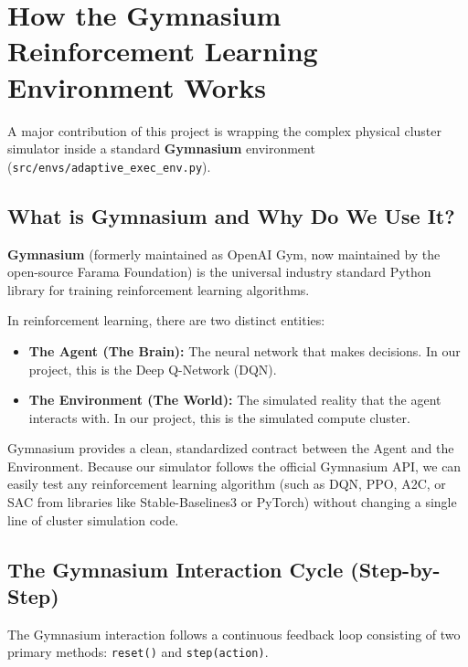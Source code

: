 \documentclass[11pt,a4paper]{article}
\begin{document}
\section{How the Gymnasium Reinforcement Learning Environment Works}
A major contribution of this project is wrapping the complex physical cluster simulator inside a standard \textbf{Gymnasium} environment (\texttt{src/envs/adaptive\_exec\_env.py}). 

\subsection{What is Gymnasium and Why Do We Use It?}
\textbf{Gymnasium} (formerly maintained as OpenAI Gym, now maintained by the open-source Farama Foundation) is the universal industry standard Python library for training reinforcement learning algorithms. 

In reinforcement learning, there are two distinct entities:
\begin{itemize}[noitemsep, topsep=1pt]
    \item \textbf{The Agent (The Brain):} The neural network that makes decisions. In our project, this is the Deep Q-Network (DQN).
    \item \textbf{The Environment (The World):} The simulated reality that the agent interacts with. In our project, this is the simulated compute cluster.
\end{itemize}
Gymnasium provides a clean, standardized contract between the Agent and the Environment. Because our simulator follows the official Gymnasium API, we can easily test any reinforcement learning algorithm (such as DQN, PPO, A2C, or SAC from libraries like Stable-Baselines3 or PyTorch) without changing a single line of cluster simulation code.

\subsection{The Gymnasium Interaction Cycle (Step-by-Step)}
The Gymnasium interaction follows a continuous feedback loop consisting of two primary methods: \texttt{reset()} and \texttt{step(action)}. 
\end{document}
